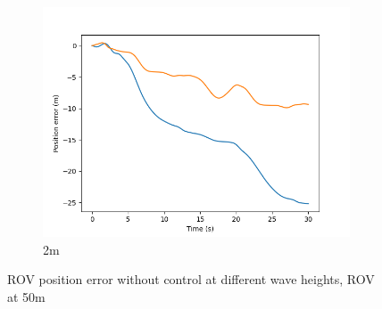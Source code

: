 \documentclass[class=article, crop=false]{standalone}
\begin{document}
\begin{figure}
\begin{subfigure}[b]{0.48\textwidth}
        \includegraphics{scenario1/rov-50m/2.0m/rov_position_error_uncontrolled}
        \caption{2m}
        \label{}
    \end{subfigure}

    \caption{ROV position error without control at different wave heights, ROV at 50m}
\end{figure}
\end{document}
